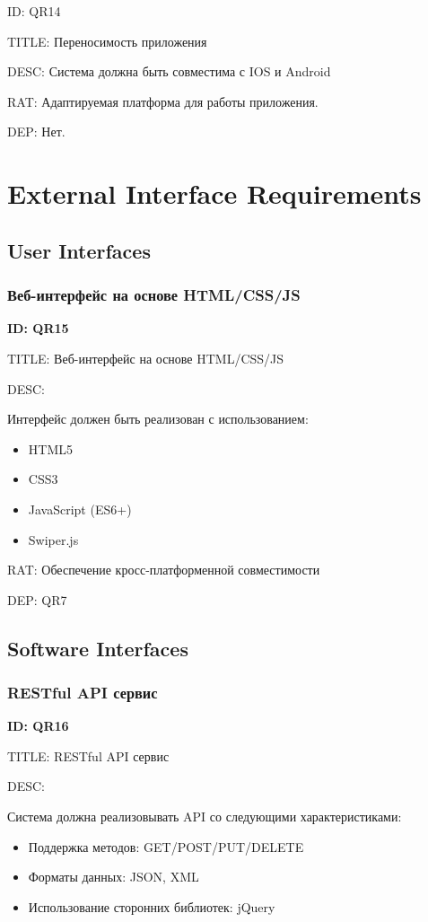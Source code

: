 \documentclass{scrreprt}
\begin{document}
ID: QR14

TITLE: Переносимость приложения

DESC: Система должна быть совместима с IOS и Android

RAT: Адаптируемая платформа для работы приложения.

DEP: Нет.
\chapter{External Interface Requirements}
\section{User Interfaces}
\subsection{Веб-интерфейс на основе HTML/CSS/JS}
\textbf{ID: QR15}

TITLE: Веб-интерфейс на основе HTML/CSS/JS

DESC:

Интерфейс должен быть реализован с использованием:
\begin{itemize}
\item HTML5
\item CSS3
\item JavaScript (ES6+)
\item Swiper.js
\end{itemize}

RAT: Обеспечение кросс-платформенной совместимости

DEP: QR7
\section{Software Interfaces}
\subsection{RESTful API сервис}
\textbf{ID: QR16}

TITLE: RESTful API сервис

DESC:

Система должна реализовывать API со следующими характеристиками:
\begin{itemize}
\item Поддержка методов: GET/POST/PUT/DELETE

\item Форматы данных: JSON, XML

\item Использование сторонних библиотек: jQuery
\end{itemize}
\end{document}
